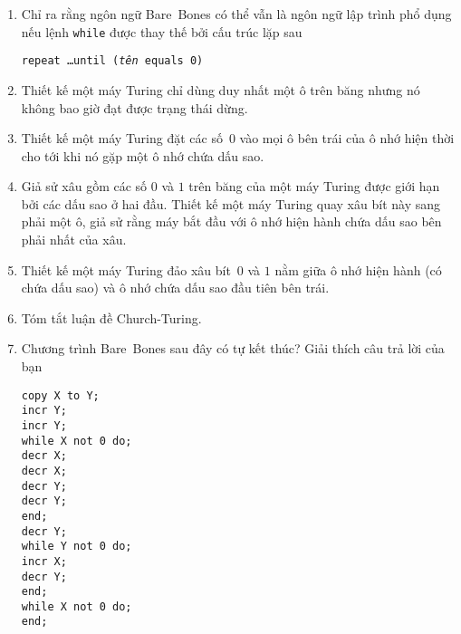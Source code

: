 \begin{multicols}{2}
\begin{enumerate}
  \item Chỉ ra rằng ngôn ngữ Bare~Bones có thể vẫn là ngôn ngữ lập trình phổ dụng nếu lệnh
    \texttt{while} được thay thế bởi cấu trúc lặp sau 
    \begin{flushleft}
      \texttt{repeat \dots until (\textit{tên} equals 0)}
    \end{flushleft}

  \item Thiết kế một máy Turing chỉ dùng duy nhất một ô trên băng nhưng nó không bao giờ
    đạt được trạng thái dừng.

  \item Thiết kế một máy Turing đặt các số~$0$ vào mọi ô bên trái của ô nhớ hiện thời cho
    tới khi nó gặp một ô nhớ chứa dấu sao.

  \item Giả sử xâu gồm các số $0$ và $1$ trên băng của một máy Turing được giới hạn bởi
    các dấu sao ở hai đầu. Thiết kế một máy Turing quay xâu bít này sang phải một ô, giả
    sử rằng máy bắt đầu với ô nhớ hiện hành chứa dấu sao bên phải nhất của xâu.

  \item Thiết kế một máy Turing đảo xâu bít~$0$ và $1$ nằm giữa ô nhớ hiện hành (có chứa
    dấu sao) và ô nhớ chứa dấu sao đầu tiên bên trái.

  \item Tóm tắt luận đề Church-Turing.

  \item Chương trình Bare~Bones sau đây có tự kết thúc? Giải thích câu trả lời của bạn
    \begin{flushleft}
      \texttt{copy X to Y;} \\
      \texttt{incr Y;} \\
      \texttt{incr Y;} \\
      \texttt{while X not 0 do;} \\
      \quad \texttt{decr X;} \\
      \quad \texttt{decr X;} \\
      \quad \texttt{decr Y;} \\
      \quad \texttt{decr Y;} \\
      \texttt{end;}\\
      \texttt{decr Y;} \\
      \texttt{while Y not 0 do;} \\
      \quad \texttt{incr X;} \\
      \quad \texttt{decr Y;} \\
      \texttt{end;}\\
      \texttt{while X not 0 do;}\\
      \texttt{end;}\\
    \end{flushleft}



\end{enumerate}
\end{multicols}
